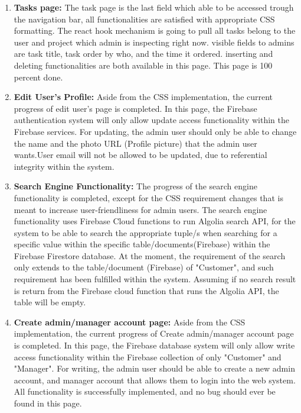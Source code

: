 \documentclass[onecolumn, draftclsnofoot,10pt, compsoc]{IEEEtran}
\begin{document}
\begin{enumerate}
  \newpage
  
  \item  \textbf{Tasks page:}\newline
  The task page is the last field which able to be accessed trough the navigation bar, all functionalities are satisfied with appropriate CSS formatting. The react hook mechanism is going to pull all tasks belong to the user and project which admin is inspecting right now. visible fields to admins are task title, task order by who, and the time it ordered. inserting and deleting functionalities are both available in this page. This page is 100 percent done.  \newline
  
  
  \item  \textbf{Edit User's Profile:}\newline
  Aside from the CSS implementation, the current progress of edit user's page is completed. In this page, the Firebase authentication system will only allow update access functionality within the Firebase services. For updating, the admin user should only be able to change the name and the photo URL (Profile picture) that the admin user wants.User email will not be allowed to be updated, due to referential integrity within the system.\newline
  
  \item \textbf{Search Engine Functionality:}\newline
  The progress of the search engine functionality is completed, except for the CSS requirement changes that is meant to increase user-friendliness for admin users. The search engine functionality uses Firebase Cloud functions to run Algolia search API, for the system to be able to search the appropriate tuple/s when searching for a specific value within the specific table/documents(Firebase) within the Firebase Firestore database. At the moment, the requirement of the search only extends to the table/document (Firebase) of "Customer", and such requirement has been fulfilled within the system. Assuming if no search result is return from the Firebase cloud function that runs the Algolia API, the table will be empty. \newline

  \item \textbf{Create admin/manager account page:}\newline
  Aside from the CSS implementation, the current progress of Create admin/manager account page is completed. In this page, the Firebase database system will only allow write access functionality within the Firebase collection of only "Customer" and "Manager". For writing, the admin user should be able to create a new admin account, and manager account that allows them to login into the web system. All functionality is successfully implemented, and no bug should ever be found in this page.\newline
  
\end{enumerate}
\end{document}
